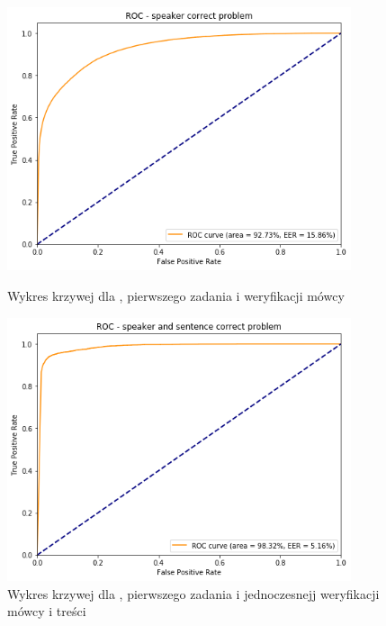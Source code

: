 \begin{figure}[H]
\end{figure}


\begin{figure}[H]
    \centering
    \begin{minipage}{.5\textwidth}
        \centering
        \includegraphics[width=0.9\textwidth]{images/4_3_hmm_roc_speaker}
        \caption{Wykres krzywej  dla , pierwszego zadania  i weryfikacji mówcy}
        \label{fig:4_3_hmm_roc_speaker}
    \end{minipage}%
    \begin{minipage}{.5\textwidth}
        \centering
        \includegraphics[width=0.9\textwidth]{images/4_3_hmm_roc_both}
        \caption{Wykres krzywej  dla , pierwszego zadania  i jednoczesnejj weryfikacji mówcy i treści}
        \label{fig:4_3_hmm_roc_both}
    \end{minipage}
\end{figure}
